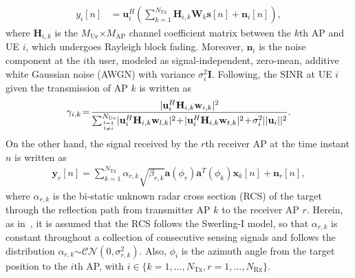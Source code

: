 \documentclass[conference,twocolumn,a4paper]{IEEEtran}
\theoremstyle{remark} \newtheorem{remark}{Remark}
\begin{document}
\begin{align}\label{eq:signali}
    y_{i}[n]&= \mathbf{u}_i^H\left(\sum_{k=1}^{N_{\mathrm{Tx}}}\mathbf{H}_{i,k}\mathbf{W}_{k}\mathbf{s}[n] +\mathbf{n}_i[n]\right),
\end{align}
where $\mathbf{H}_{i,k}$ is the $M_{\mathrm{Ue}}$$\times$$M_{\mathrm{AP}}$ channel coefficient matrix between the $k$th AP and UE $i$, which undergoes Rayleigh block fading. Moreover, $\mathbf{n}_i$ is the noise component at the $i$th user, modeled as signal-independent, zero-mean, additive white Gaussian noise (AWGN) with variance $\sigma^2_i\mathbf{I}$. Following, the SINR at UE $i$ given the transmission of AP $k$ is written as
\begin{align}
    \gamma_{i,k}\!=\!\frac{|\mathbf{u}_i^H\mathbf{H}_{i,k}\mathbf{w}_{i,k}|^2}{\sum_{l=1 \atop l \neq i}^{N_{\mathrm{Ue}}}\!|\mathbf{u}_i^H\mathbf{H}_{i,k}\mathbf{w}_{l,k}|^2\!+\!|\mathbf{u}_i^H\mathbf{H}_{i,k}\mathbf{w}_{t,k}|^2\!+\!\sigma^2_i||\mathbf{u}_i||^2}.
\end{align}
On the other hand, the signal received by the $r$th receiver AP at the time instant $n$ is written as
\begin{align}
\mathbf{y}_r[n]\!=\!\!\!\sum_{k=1}^{N_{\mathrm{Tx}}}\!\!\alpha_{r,k} \sqrt{\beta_{r,k}}\mathbf{a}(\phi_r)\mathbf{a}^T(\phi_k)\mathbf{x}_k[n] \!+\!\mathbf{n}_r[n],
\end{align}
where $\alpha_{r,k}$ is the bi-static unknown radar cross section (RCS) of the target through the reflection path from transmitter AP $k$ to the receiver AP $r$. Herein, as in~\cite{Art:Emil}, it is assumed that the RCS follows the Swerling-I model, so that $\alpha_{r,k}$ is constant throughout a collection of consecutive sensing signals and follows the distribution $\alpha_{r,k}$$\sim$$\mathcal{CN}(0,\sigma_{r,k}^2)$. Also, $\phi_i$ is the azimuth angle from the target position to the $i$th AP, with $i \in \{k = 1, \dots, N_{\mathrm{Tx}},r = 1, \dots, N_{\mathrm{Rx}}\}$. 
\end{document}
